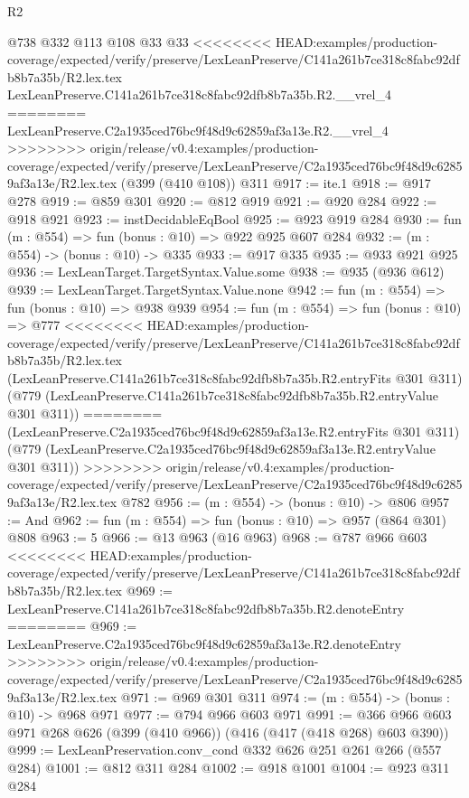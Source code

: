 \begin{lexlean}{R2}
\begin{coremodule}
{{{{{{{{{{{{{{{{{{{{{{    @738
    @332
    @113
    @108
    @33
    @33
<<<<<<<< HEAD:examples/production-coverage/expected/verify/preserve/LexLeanPreserve/C141a261b7ce318c8fabc92dfb8b7a35b/R2.lex.tex
    LexLeanPreserve.C141a261b7ce318c8fabc92dfb8b7a35b.R2.__vrel_4
========
    LexLeanPreserve.C2a1935ced76bc9f48d9c62859af3a13e.R2.__vrel_4
>>>>>>>> origin/release/v0.4:examples/production-coverage/expected/verify/preserve/LexLeanPreserve/C2a1935ced76bc9f48d9c62859af3a13e/R2.lex.tex
    (@399 (@410 @108))
    @311
@917 := ite.{1}
@918 := @917 @278
@919 := @859 @301
@920 := @812 @919
@921 := @920 @284
@922 := @918 @921
@923 := instDecidableEqBool
@925 := @923 @919 @284
@930 := fun (m : @554) => fun (bonus : @10) => @922 @925 @607 @284
@932 := (m : @554) -> (bonus : @10) -> @335
@933 := @917 @335
@935 := @933 @921 @925
@936 := LexLeanTarget.TargetSyntax.Value.some
@938 := @935 (@936 @612)
@939 := LexLeanTarget.TargetSyntax.Value.none
@942 := fun (m : @554) => fun (bonus : @10) => @938 @939
@954 := fun (m : @554) =>
  fun (bonus : @10) =>
  @777
<<<<<<<< HEAD:examples/production-coverage/expected/verify/preserve/LexLeanPreserve/C141a261b7ce318c8fabc92dfb8b7a35b/R2.lex.tex
    (LexLeanPreserve.C141a261b7ce318c8fabc92dfb8b7a35b.R2.entryFits @301 @311)
    (@779 (LexLeanPreserve.C141a261b7ce318c8fabc92dfb8b7a35b.R2.entryValue @301 @311))
========
    (LexLeanPreserve.C2a1935ced76bc9f48d9c62859af3a13e.R2.entryFits @301 @311)
    (@779 (LexLeanPreserve.C2a1935ced76bc9f48d9c62859af3a13e.R2.entryValue @301 @311))
>>>>>>>> origin/release/v0.4:examples/production-coverage/expected/verify/preserve/LexLeanPreserve/C2a1935ced76bc9f48d9c62859af3a13e/R2.lex.tex
    @782
@956 := (m : @554) -> (bonus : @10) -> @806
@957 := And
@962 := fun (m : @554) => fun (bonus : @10) => @957 (@864 @301) @808
@963 := 5
@966 := @13 @963 (@16 @963)
@968 := @787 @966 @603
<<<<<<<< HEAD:examples/production-coverage/expected/verify/preserve/LexLeanPreserve/C141a261b7ce318c8fabc92dfb8b7a35b/R2.lex.tex
@969 := LexLeanPreserve.C141a261b7ce318c8fabc92dfb8b7a35b.R2.denoteEntry
========
@969 := LexLeanPreserve.C2a1935ced76bc9f48d9c62859af3a13e.R2.denoteEntry
>>>>>>>> origin/release/v0.4:examples/production-coverage/expected/verify/preserve/LexLeanPreserve/C2a1935ced76bc9f48d9c62859af3a13e/R2.lex.tex
@971 := @969 @301 @311
@974 := (m : @554) -> (bonus : @10) -> @968 @971
@977 := @794 @966 @603 @971
@991 := @366 @966 @603 @971 @268 @626 (@399 (@410 @966)) (@416 (@417 (@418 @268) @603 @390))
@999 := LexLeanPreservation.conv_cond @332 @626 @251 @261 @266 (@557 @284)
@1001 := @812 @311 @284
@1002 := @918 @1001
@1004 := @923 @311 @284
}}}}}}}}}}}}}}}}}}}}}}
\end{coremodule}
\end{lexlean}
